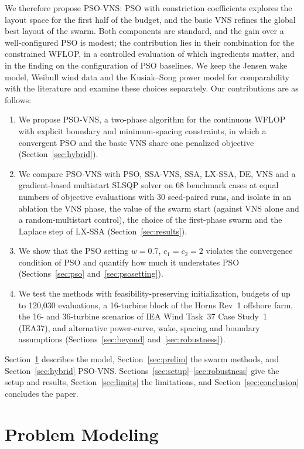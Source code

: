 \documentclass[journal,twoside]{IEEEtran}
\begin{document}
We therefore propose PSO-VNS: PSO with constriction coefficients explores the layout space for the first half of the budget, and the basic VNS refines the global best layout of the swarm. Both components are standard, and the gain over a well-configured PSO is modest; the contribution lies in their combination for the constrained WFLOP, in a controlled evaluation of which ingredients matter, and in the finding on the configuration of PSO baselines. We keep the Jensen wake model, Weibull wind data and the Kusiak--Song power model for comparability with the literature and examine these choices separately. Our contributions are as follows:
\begin{enumerate}
\item We propose PSO-VNS, a two-phase algorithm for the continuous WFLOP with explicit boundary and minimum-spacing constraints, in which a convergent PSO and the basic VNS share one penalized objective (Section~\ref{sec:hybrid}).
\item We compare PSO-VNS with PSO, SSA-VNS, SSA, LX-SSA, DE, VNS and a gradient-based multistart SLSQP solver on 68 benchmark cases at equal numbers of objective evaluations with 30 seed-paired runs, and isolate in an ablation the VNS phase, the value of the swarm start (against VNS alone and a random-multistart control), the choice of the first-phase swarm and the Laplace step of LX-SSA (Section~\ref{sec:results}).
\item We show that the PSO setting $w=0.7$, $c_1=c_2=2$ violates the convergence condition of PSO and quantify how much it understates PSO (Sections~\ref{sec:pso} and~\ref{sec:psosetting}).
\item We test the methods with feasibility-preserving initialization, budgets of up to 120,030 evaluations, a 16-turbine block of the Horns Rev~1 offshore farm, the 16- and 36-turbine scenarios of IEA Wind Task~37 Case Study~1 (IEA37), and alternative power-curve, wake, spacing and boundary assumptions (Sections~\ref{sec:beyond} and~\ref{sec:robustness}).
\end{enumerate}

Section~\ref{sec:model} describes the model, Section~\ref{sec:prelim} the swarm methods, and Section~\ref{sec:hybrid} PSO-VNS. Sections~\ref{sec:setup}--\ref{sec:robustness} give the setup and results, Section~\ref{sec:limits} the limitations, and Section~\ref{sec:conclusion} concludes the paper.

\section{Problem Modeling}
\label{sec:model}
\end{document}
